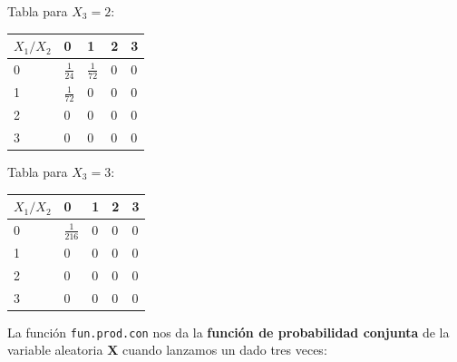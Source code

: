\documentclass[]{book}
\begin{document}
Tabla para \(X_3=2\):

\begin{longtable}[]{@{}lllll@{}}
\toprule
\(X_1/X_2\) & 0 & 1 & 2 & 3\tabularnewline
\midrule
\endhead
0 & \(\frac{1}{24}\) & \(\frac{1}{72}\) & \(0\) & \(0\)\tabularnewline
1 & \(\frac{1}{72}\) & \(0\) & \(0\) & \(0\)\tabularnewline
2 & \(0\) & \(0\) & \(0\) & \(0\)\tabularnewline
3 & \(0\) & \(0\) & \(0\) & \(0\)\tabularnewline
\bottomrule
\end{longtable}

Tabla para \(X_3=3\):

\begin{longtable}[]{@{}lllll@{}}
\toprule
\(X_1/X_2\) & 0 & 1 & 2 & 3\tabularnewline
\midrule
\endhead
0 & \(\frac{1}{216}\) & \(0\) & \(0\) & \(0\)\tabularnewline
1 & \(0\) & \(0\) & \(0\) & \(0\)\tabularnewline
2 & \(0\) & \(0\) & \(0\) & \(0\)\tabularnewline
3 & \(0\) & \(0\) & \(0\) & \(0\)\tabularnewline
\bottomrule
\end{longtable}

La función \texttt{fun.prod.con} nos da la \textbf{función de probabilidad conjunta} de la variable aleatoria \(\mathbf{X}\) cuando lanzamos un dado tres veces:
\end{document}
